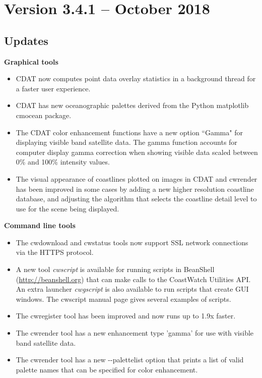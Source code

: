 \section{Version 3.4.1 -- October 2018}

\subsection*{ Updates}

\hspace{0.4cm} {\bf Graphical tools}
\begin{itemize}

  \item CDAT now computes point data overlay statistics in a background thread
  for a faster user experience.

  \item CDAT has new oceanographic palettes derived from the Python matplotlib
  cmocean package.

  \item The CDAT color enhancement functions have a new option ``Gamma" for
  displaying visible band satellite data.  The gamma function accounts for
  computer display gamma correction when showing visible data scaled between
  0\% and 100\% intensity values.

  \item The visual appearance of coastlines plotted on images in CDAT and
  cwrender has been improved in some cases by adding a new higher
  resolution coastline database, and adjusting the algorithm that selects
  the coastline detail level to use for the scene being displayed.

\end{itemize}

\hspace{0.4cm} {\bf Command line tools}
\begin{itemize}

    \item The cwdownload and cwstatus tools now support SSL network connections
    via the HTTPS protocol.

    \item A new tool {\em cwscript} is available for running scripts in
    BeanShell (\url{http://beanshell.org}) that can make calls to the
    CoastWatch Utilities API.  An extra launcher {\em cwgscript}
    is also available to run scripts that create GUI windows.  The cwscript
    manual page gives several examples of scripts.

    \item The cwregister tool has been improved and now runs up to 1.9x faster.

    \item The cwrender tool has a new enhancement type 'gamma' for use with
    visible band satellite data.

    \item The cwrender tool has a new -{-}palettelist option that prints a list
    of valid palette names that can be specified for color enhancement.

\end{itemize}

